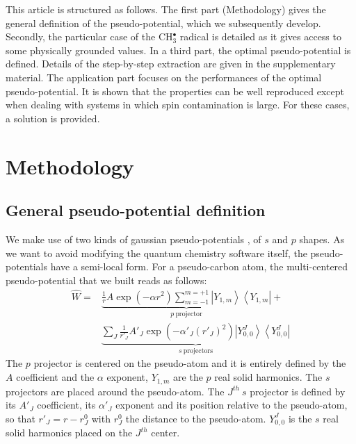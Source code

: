 \documentclass[aip,reprint]{revtex4-1}
\begin{document}
This article is structured as follows.
The first part (Methodology) gives the general definition of the pseudo-potential, which we subsequently develop.
Secondly, the particular case of the CH$_3^\bullet$ radical is detailed as it gives access
to some physically grounded values.
In a third part, the optimal pseudo-potential is defined. Details of the step-by-step extraction
are given in the supplementary material.
The application part focuses on the performances of the optimal pseudo-potential.
It is shown that the properties can be well reproduced except when dealing with
systems in which spin contamination is large.
For these cases, a solution is provided.

\section{Methodology}

\subsection{General pseudo-potential definition}

We make use of two kinds of gaussian pseudo-potentials \cite{me_structure_theory}, of \(s\) and \(p\) shapes. As we want to avoid modifying the quantum chemistry software itself, the pseudo-potentials have a semi-local form.
For a pseudo-carbon atom,
the multi-centered pseudo-potential that we built reads as follows:
\begin{align}
\label{eq:ourPP}
\hat{W} =&
\underbrace{\frac{1}{r} A\exp(-\alpha r^2)\sum_{m=-1}^{m=+1}\left|Y_{1,m}\right>\left<Y_{1,m}\right|}_{p \ \text{projector}}%
+\\
&\underbrace{\sum_J \frac{1}{r'_J} A'_J\exp(-\alpha'_J (r'_J)^2)\left|Y_{0,0}^J\right>\left<Y_{0,0}^J\right|}_{s \ \text{projectors}}%
\nonumber
\end{align}
The $p$ projector is centered on the pseudo-atom and it is entirely defined by the $A$ coefficient
and the $\alpha$ exponent, $Y_{1,m}$ are the $p$ real solid harmonics. The $s$ projectors are
placed around the pseudo-atom. The $J^{th} \ s$ projector is defined by its $A'_J$ coefficient, its
$\alpha'_J$ exponent and its position relative to the pseudo-atom, so that $r'_J = r-r^0_J$ with
$r^0_J$ the distance to the pseudo-atom. $Y_{0,0}^J$ is the $s$ real solid harmonics placed on
the $J^{th}$ center.
\end{document}
